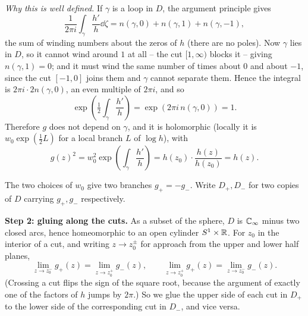 \documentclass[a4paper]{scrartcl}
\newcommand{\Cinf}{\C_\infty}
\begin{document}
\begin{center}
\end{center}

\emph{Why this is well defined.} If $\gamma$ is a loop in $D$, the argument principle
gives
$$
\frac{1}{2\pi i}\int_\gamma \frac{h'}{h}\dd\zeta = n(\gamma, 0) + n(\gamma,1) + n(\gamma,-1),
$$
the sum of winding numbers about the zeros of $h$ (there are no poles). Now $\gamma$ lies
in $D$, so it cannot wind around $1$ at all -- the cut $[1,\infty)$ blocks it -- giving
$n(\gamma,1) = 0$; and it must wind the same number of times about $0$ and about $-1$,
since the cut $[-1,0]$ joins them and $\gamma$ cannot separate them. Hence the integral is
$2\pi i \cdot 2n(\gamma,0)$, an even multiple of $2\pi i$, and so
$$
\exp\left(\tfrac12 \int_\gamma \frac{h'}{h}\right) = \exp(2\pi i \, n(\gamma,0)) = 1.
$$
Therefore $g$ does not depend on $\gamma$, and it is holomorphic (locally it is
$w_0 \exp(\frac12 L)$ for a local branch $L$ of $\log h$), with
$$
g(z)^2 = w_0^2 \exp\left(\int_\gamma \frac{h'}{h}\right) = h(z_0)\cdot \frac{h(z)}{h(z_0)} = h(z).
$$

The two choices of $w_0$ give two branches $g_+ = -g_-$. Write $D_+, D_-$ for two copies
of $D$ carrying $g_+, g_-$ respectively.

\vspace{0.4em}
\textbf{Step 2: gluing along the cuts.} As a subset of the sphere, $D$ is $\Cinf$ minus
two closed arcs, hence homeomorphic to an open cylinder $S^1 \times \mathbb{R}$. For
$z_0$ in the interior of a cut, and writing $z \to z_0^{\pm}$ for approach from the upper
and lower half planes,
$$
\lim_{z \to z_0^-} g_+(z) = \lim_{z\to z_0^+} g_-(z), \qquad
\lim_{z\to z_0^+} g_+(z) = \lim_{z\to z_0^-} g_-(z).
$$
(Crossing a cut flips the sign of the square root, because the argument of exactly one of
the factors of $h$ jumps by $2\pi$.) So we glue the upper side of each cut in $D_+$ to the
lower side of the corresponding cut in $D_-$, and vice versa.
\end{document}
